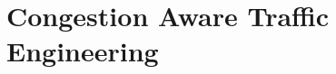 \chapter{Congestion Aware Traffic Engineering}
\label{sec:cate}

\renewcommand{\locfolder}{\chapfolder/cate}



